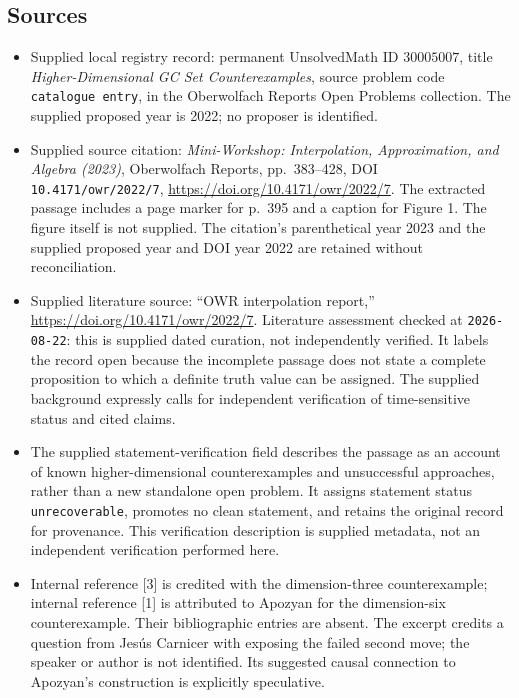 \documentclass[11pt]{article}
\begin{document}
\subsection{Sources}
\begin{itemize}
\item Supplied local registry record: permanent UnsolvedMath ID \(30005007\), title \emph{Higher-Dimensional GC Set Counterexamples}, source problem code \texttt{catalogue entry}, in the Oberwolfach Reports Open Problems collection. The supplied proposed year is 2022; no proposer is identified.
\item Supplied source citation: \emph{Mini-Workshop: Interpolation, Approximation, and Algebra (2023)}, Oberwolfach Reports, pp.\ 383--428, DOI \texttt{10.4171/owr/2022/7}, \url{https://doi.org/10.4171/owr/2022/7}. The extracted passage includes a page marker for p.\ 395 and a caption for Figure 1. The figure itself is not supplied. The citation's parenthetical year 2023 and the supplied proposed year and DOI year 2022 are retained without reconciliation.
\item Supplied literature source: ``OWR interpolation report,'' \url{https://doi.org/10.4171/owr/2022/7}. Literature assessment checked at \texttt{2026-08-22}: this is supplied dated curation, not independently verified. It labels the record open because the incomplete passage does not state a complete proposition to which a definite truth value can be assigned. The supplied background expressly calls for independent verification of time-sensitive status and cited claims.
\item The supplied statement-verification field describes the passage as an account of known higher-dimensional counterexamples and unsuccessful approaches, rather than a new standalone open problem. It assigns statement status \texttt{unrecoverable}, promotes no clean statement, and retains the original record for provenance. This verification description is supplied metadata, not an independent verification performed here.
\item Internal reference [3] is credited with the dimension-three counterexample; internal reference [1] is attributed to Apozyan for the dimension-six counterexample. Their bibliographic entries are absent. The excerpt credits a question from Jes\'us Carnicer with exposing the failed second move; the speaker or author is not identified. Its suggested causal connection to Apozyan's construction is explicitly speculative.
\end{itemize}
\end{document}
